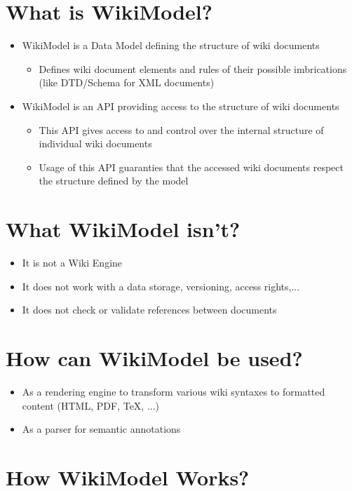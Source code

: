 \documentclass{article}
\begin{document}
\section{What is WikiModel?}
\begin{itemize}
 \item WikiModel is a Data Model defining the structure of wiki documents\begin{itemize}
 \item Defines wiki document elements and rules of their possible imbrications (like DTD/Schema for XML documents)
\end{itemize}

 \item WikiModel is an API providing access to the structure of wiki documents\begin{itemize}
 \item This API gives access to and control over the internal structure of individual wiki documents
 \item Usage of this API guaranties that the accessed wiki documents respect the structure defined by the model
 
\end{itemize}

\end{itemize}

\section{What WikiModel isn't?}
\begin{itemize}
 \item It is not a Wiki Engine
 \item It does not work with a data storage, versioning, access rights,...
 \item It does not check or validate references between documents
\end{itemize}

\section{How can WikiModel be used?}
\begin{itemize}
 \item As a rendering engine to transform various wiki  syntaxes to formatted content (HTML, PDF, TeX, ...)
 \item As a parser for semantic annotations
\end{itemize}

\section{How WikiModel Works?}
\end{document}
